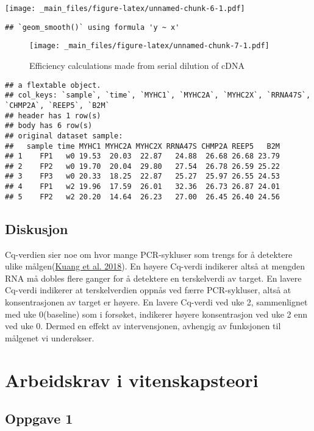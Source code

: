 \documentclass[
]{book}
\begin{document}
\texttt{[image: \_main\_files/figure-latex/unnamed-chunk-6-1.pdf]}

\begin{verbatim}
## `geom_smooth()` using formula 'y ~ x'
\end{verbatim}

\begin{figure}
\centering
\texttt{[image: \_main\_files/figure-latex/unnamed-chunk-7-1.pdf]}
\caption{Efficiency calculations made from serial dilution of cDNA}
\end{figure}

\begin{verbatim}
## a flextable object.
## col_keys: `sample`, `time`, `MYHC1`, `MYHC2A`, `MYHC2X`, `RRNA47S`, `CHMP2A`, `REEP5`, `B2M` 
## header has 1 row(s) 
## body has 6 row(s) 
## original dataset sample: 
##   sample time MYHC1 MYHC2A MYHC2X RRNA47S CHMP2A REEP5   B2M
## 1    FP1   w0 19.53  20.03  22.87   24.88  26.68 26.68 23.79
## 2    FP2   w0 19.70  20.04  29.80   27.54  26.78 26.59 25.22
## 3    FP3   w0 20.33  18.25  22.87   25.27  25.97 26.55 24.53
## 4    FP1   w2 19.96  17.59  26.01   32.36  26.73 26.87 24.01
## 5    FP2   w2 20.20  14.64  26.23   27.00  26.45 26.40 24.56
\end{verbatim}

\hypertarget{diskusjon-1}{%
\section{Diskusjon}\label{diskusjon-1}}

Cq-verdien sier noe om hvor mange PCR-sykluser som trengs for å
detektere ulike målgen(\protect\hyperlink{ref-kuang2018}{Kuang et al.
2018}). En høyere Cq-verdi indikerer altså at mengden RNA må dobles
flere ganger for å detektere en terskelverdi av target. En lavere
Cq-verdi indikerer at terskelverdien oppnås ved færre PCR-sykluser,
altså at konsentrasjonen av target er høyere. En lavere Cq-verdi ved uke
2, sammenlignet med uke 0(baseline) som i forsøket, indikerer høyere
konsentrasjon ved uke 2 enn ved uke 0. Dermed en effekt av
intervensjonen, avhengig av funksjonen til målgenet vi underøkser.

\hypertarget{arbeidskrav-i-vitenskapsteori}{%
\chapter{Arbeidskrav i
vitenskapsteori}\label{arbeidskrav-i-vitenskapsteori}}

\hypertarget{oppgave-1}{%
\section{Oppgave 1}\label{oppgave-1}}
\end{document}
